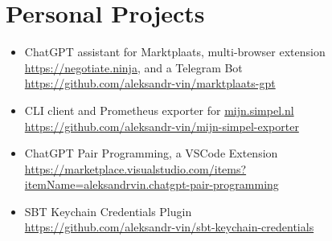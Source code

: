 \section*{Personal Projects}

\begin{itemize}[noitemsep, nosep]
  \item ChatGPT assistant for Marktplaats, multi-browser extension \href{https://negotiate.ninja}{\url{https://negotiate.ninja}}, and a Telegram Bot \\
  \href{https://github.com/aleksandr-vin/marktplaats-gpt}{\url{https://github.com/aleksandr-vin/marktplaats-gpt}}
  \item CLI client and Prometheus exporter for \url{mijn.simpel.nl} \\
  \href{https://github.com/aleksandr-vin/mijn-simpel-exporter}{\url{https://github.com/aleksandr-vin/mijn-simpel-exporter}}
  \item ChatGPT Pair Programming, a VSCode Extension \\
  \href{https://marketplace.visualstudio.com/items?itemName=aleksandrvin.chatgpt-pair-programming}{\url{https://marketplace.visualstudio.com/items?itemName=aleksandrvin.chatgpt-pair-programming}}
  \item SBT Keychain Credentials Plugin \\
  \href{https://github.com/aleksandr-vin/sbt-keychain-credentials}{\url{https://github.com/aleksandr-vin/sbt-keychain-credentials}}
\end{itemize}
